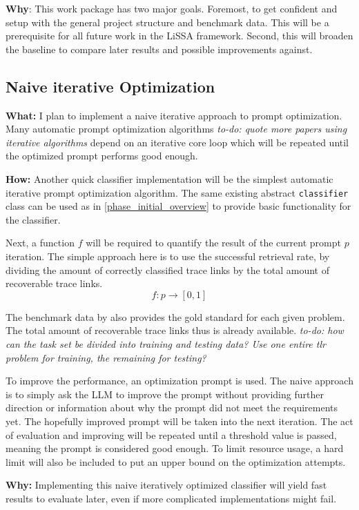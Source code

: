 \textbf{Why}: This work package has two major goals. Foremost, to get confident and setup with the general project structure and benchmark data. This will be a prerequisite for all future work in the LiSSA framework. Second, this will broaden the baseline to compare later results and possible improvements against.


\subsection{Naive iterative Optimization}
\label{phase_naive_iterative}
\textbf{What:} I plan to implement a naive iterative approach to prompt optimization. Many automatic prompt optimization algorithms \cite{pryzant2023AutomaticPrompt} \textit{to-do: quote more papers using iterative algorithms} depend on an iterative core loop which will be repeated until the optimized prompt performs good enough.

\textbf{How:} Another quick classifier implementation will be the simplest automatic iterative prompt optimization algorithm. The same existing abstract \verb|classifier| class can be used as in \ref{phase_initial_overview} to provide basic functionality for the classifier.

Next, a function $f$ will be required to quantify the result of the current prompt $p$ iteration. The simple approach here is to use the successful retrieval rate, by dividing the amount of correctly classified trace links by the total amount of recoverable trace links.
\[f: p \rightarrow [0, 1]\]

The benchmark data by  also provides the gold standard for each given problem. The total amount of recoverable trace links thus is already available. \textit{to-do: how can the task set be divided into training and testing data? Use one entire tlr problem for training, the remaining for testing?}

To improve the performance, an optimization prompt is used. The naive approach is to simply ask the LLM to improve the prompt without providing further direction or information about why the prompt did not meet the requirements yet. The hopefully improved prompt will be taken into the next iteration. The act of evaluation and improving will be repeated until a threshold value is passed, meaning the prompt is considered good enough. To limit resource usage, a hard limit will also be included to put an upper bound on the optimization attempts.


\textbf{Why:} Implementing this naive iteratively optimized classifier will yield fast results to evaluate later, even if more complicated implementations might fail.  


